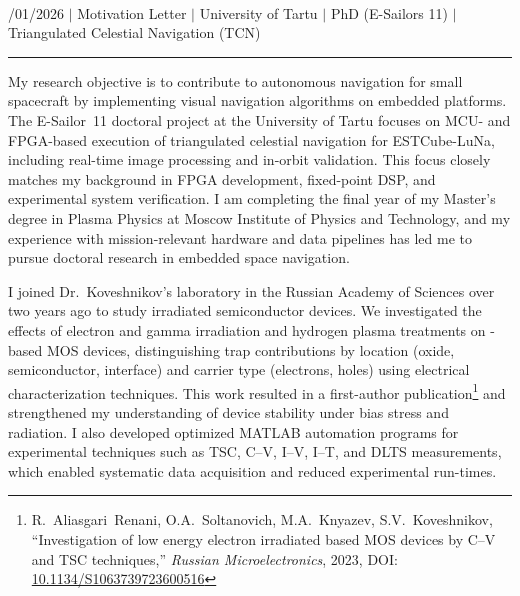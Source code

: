 \documentclass[a4paper,12pt]{article}
\begin{document}
{\centering
  {\scshape {}} \\ 
  {\fontsize{10}{10}/01/2026} $|$
  {\fontsize{10}{10}\selectfont Motivation Letter} $|$
  {\fontsize{10}{10}\selectfont University of Tartu} $|$
  {\fontsize{10}{10}\selectfont PhD (E-Sailors 11)} $|$
  {\fontsize{10}{10}\selectfont Triangulated Celestial Navigation (TCN)}
\par}
\vspace{-15pt}
\noindent\rule{\textwidth}{0.5pt}

\vspace{-5pt}

My research objective is to contribute to autonomous navigation for small spacecraft by implementing visual navigation algorithms on embedded platforms. The E-Sailor~11 doctoral project at the University of Tartu focuses on MCU- and FPGA-based execution of triangulated celestial navigation for ESTCube-LuNa, including real-time image processing and in-orbit validation. This focus closely matches my background in FPGA development, fixed-point DSP, and experimental system verification. I am completing the final year of my Master's degree in Plasma Physics at Moscow Institute of Physics and Technology, and my experience with mission-relevant hardware and data pipelines has led me to pursue doctoral research in embedded space navigation.

I joined Dr.\ Koveshnikov's laboratory in the Russian Academy of Sciences over two years ago to study irradiated semiconductor devices. We investigated the effects of electron and gamma irradiation and hydrogen plasma treatments on -based MOS devices, distinguishing trap contributions by location (oxide, semiconductor, interface) and carrier type (electrons, holes) using electrical characterization techniques. This work resulted in a first-author publication\footnote{R.~Aliasgari~Renani, O.A.~Soltanovich, M.A.~Knyazev, S.V.~Koveshnikov, ``Investigation of low energy electron irradiated  based MOS devices by C--V and TSC techniques,'' \textit{Russian Microelectronics}, 2023, DOI: \href{https://doi.org/10.1134/S1063739723600516}{10.1134/S1063739723600516}} and strengthened my understanding of device stability under bias stress and radiation. I also developed optimized MATLAB automation programs for experimental techniques such as TSC, C--V, I--V, I--T, and DLTS measurements, which enabled systematic data acquisition and reduced experimental run-times.
\end{document}
